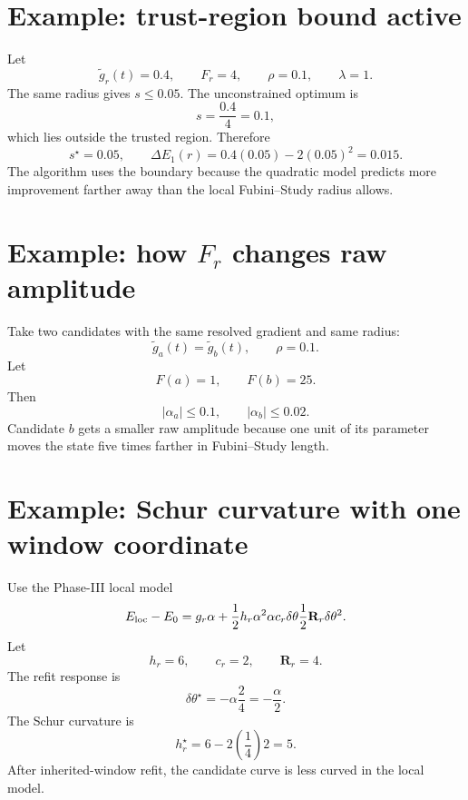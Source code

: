 \documentclass[10pt,twocolumn]{article}
\begin{document}
\section{Example: trust-region bound active}

Let
\begin{equation}
\widetilde g_r(t)=0.4,\qquad
F_r=4,\qquad
\rho=0.1,\qquad
\lambda=1.
\label{eq:ex2_data}
\end{equation}
The same radius gives \(s\le0.05\). The unconstrained optimum is
\begin{equation}
s=\frac{0.4}{4}=0.1,
\label{eq:ex2_uncon}
\end{equation}
which lies outside the trusted region. Therefore
\begin{equation}
s^\star=0.05,
\qquad
\Delta E_1(r)=0.4(0.05)-2(0.05)^2=0.015.
\label{eq:ex2_gain}
\end{equation}
The algorithm uses the boundary because the quadratic model predicts more improvement farther away than the local Fubini--Study radius allows.

\section{Example: how \(F_r\) changes raw amplitude}

Take two candidates with the same resolved gradient and same radius:
\begin{equation}
\widetilde g_a(t)=\widetilde g_b(t),
\qquad
\rho=0.1.
\label{eq:ex3_same}
\end{equation}
Let
\begin{equation}
F(a)=1,\qquad F(b)=25.
\label{eq:ex3_F}
\end{equation}
Then
\begin{equation}
|\alpha_a|\le0.1,
\qquad
|\alpha_b|\le0.02.
\label{eq:ex3_bounds}
\end{equation}
Candidate \(b\) gets a smaller raw amplitude because one unit of its parameter moves the state five times farther in Fubini--Study length.

\section{Example: Schur curvature with one window coordinate}

Use the Phase-III local model
\begin{equation}
E_{\rm loc}-E_0
=g_r\alpha+\frac12h_r\alpha^2
\alpha c_r\delta\theta
\frac12\mathbf R_r\delta\theta^2.
\label{eq:ex4_model}
\end{equation}
Let
\begin{equation}
h_r=6,\qquad c_r=2,\qquad \mathbf R_r=4.
\label{eq:ex4_data}
\end{equation}
The refit response is
\begin{equation}
\delta\theta^\star=-\alpha\frac{2}{4}=-\frac{\alpha}{2}.
\label{eq:ex4_response}
\end{equation}
The Schur curvature is
\begin{equation}
h_r^\star=6-2\left(\frac14\right)2=5.
\label{eq:ex4_schur}
\end{equation}
After inherited-window refit, the candidate curve is less curved in the local model.
\end{document}

